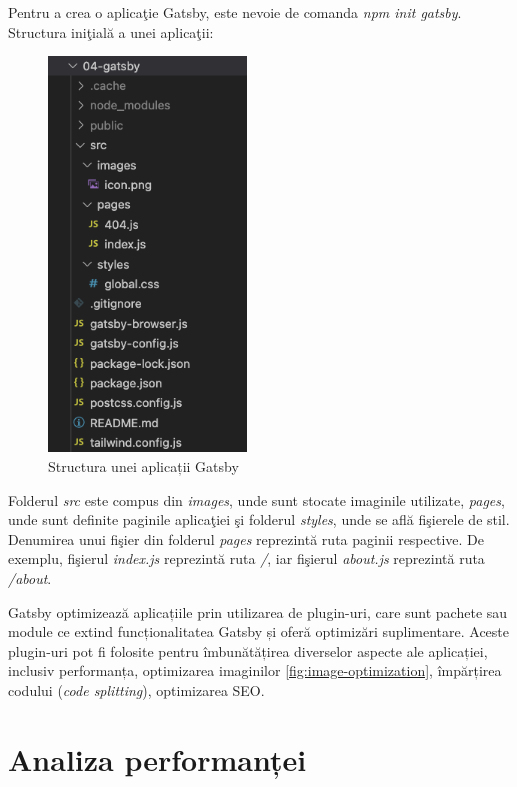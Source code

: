 \documentclass[12pt, a4paper]{report}
\begin{document}
Pentru a crea o aplica\c tie Gatsby, este nevoie de comanda \textit{npm init gatsby}. Structura ini\c tial\u a a unei aplica\c tii:

\begin{figure}[htbp]
	\centering
	\includegraphics[width=0.47\textwidth]{gatsby_file_structure.png}
	\caption{Structura unei aplicații Gatsby}
	\label{fig:gatsby-structure}
\end{figure}

Folderul \textit{src} este compus din \textit{images}, unde sunt stocate imaginile utilizate, \textit{pages}, unde sunt definite paginile aplica\c tiei \c si folderul \textit{styles}, unde se afl\u a fi\c sierele de stil. Denumirea unui fi\c sier din folderul \textit{pages} reprezint\u a ruta paginii respective. De exemplu, fi\c sierul \textit{index.js} reprezint\u a ruta \textit{/}, iar fi\c sierul \textit{about.js} reprezint\u a ruta \textit{/about}.

Gatsby optimizează aplicațiile prin utilizarea de plugin-uri, care sunt pachete sau module ce extind funcționalitatea Gatsby și oferă optimizări suplimentare. Aceste plugin-uri pot fi folosite pentru îmbunătățirea diverselor aspecte ale aplicației, inclusiv performanța, optimizarea imaginilor \ref{fig:image-optimization}, împărțirea codului (\textit{code splitting}), optimizarea SEO.

\section{Analiza performanței}
\end{document}
